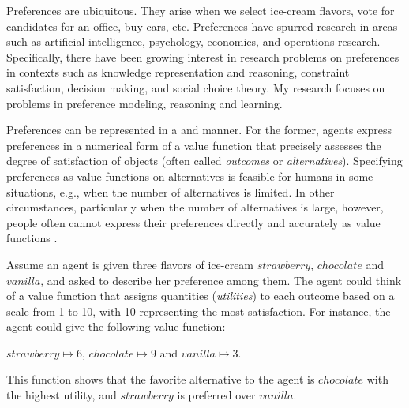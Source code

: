 Preferences are ubiquitous.
They arise when we select ice-cream flavors, vote for candidates for an office,
buy cars, etc.
Preferences have spurred research in areas such as 
artificial intelligence, psychology, economics, and operations research.
Specifically, there have been growing interest in research problems on
preferences in contexts such as knowledge representation and reasoning, constraint 
satisfaction, decision making, and social choice theory. 
My research focuses on problems in preference modeling, 
reasoning and learning.

Preferences can be represented in a  and  manner.
For the former, agents express preferences in a numerical form of
a value function that precisely assesses the degree of satisfaction
of objects
(often called \textit{outcomes} or \textit{alternatives}).
Specifying preferences as value functions on alternatives
is feasible for humans in some situations, e.g., 
when the number of alternatives is limited.
In other circumstances, particularly when the number of alternatives is large, however,
people often cannot express their 
preferences directly and accurately as value 
functions \cite{Domshlak20111037}.

Assume an agent is given three flavors of ice-cream 
$strawberry$, $chocolate$ and $vanilla$, and asked to describe 
her preference among them.
The agent could think of a value function that
assigns quantities (\textit{utilities}) to each outcome
based on a scale from 1 to 10, with 10 representing the most satisfaction.
For instance, the agent could give the following value function:
\begin{center}
	$strawberry \mapsto 6$, $chocolate \mapsto 9$ and $vanilla \mapsto 3$.
\end{center}
This function shows that the favorite alternative to the agent is
$chocolate$ with the highest utility, and
$strawberry$ is preferred over $vanilla$.

